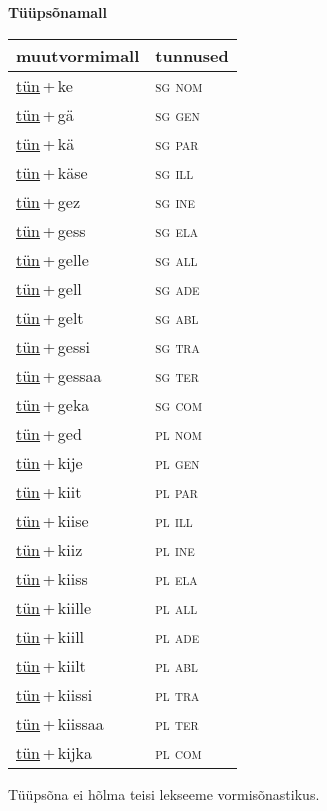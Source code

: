 
\vspace{1.8em}
\begin{minipage}{\textwidth}
\textbf{Tüüpsõnamall \,}\\

\begin{sideways}
\begin{tabular}{l l}
muutvormimall & tunnused \\
\hline
\underline{tün}\,+\,ke & \textsc{ sg nom } \\
\underline{tün}\,+\,gä & \textsc{ sg gen } \\
\underline{tün}\,+\,kä & \textsc{ sg par } \\
\underline{tün}\,+\,käse & \textsc{ sg ill } \\
\underline{tün}\,+\,gez & \textsc{ sg ine } \\
\underline{tün}\,+\,gess & \textsc{ sg ela } \\
\underline{tün}\,+\,gelle & \textsc{ sg all } \\
\underline{tün}\,+\,gell & \textsc{ sg ade } \\
\underline{tün}\,+\,gelt & \textsc{ sg abl } \\
\underline{tün}\,+\,gessi & \textsc{ sg tra } \\
\underline{tün}\,+\,gessaa & \textsc{ sg ter } \\
\underline{tün}\,+\,geka & \textsc{ sg com } \\
\underline{tün}\,+\,ged & \textsc{ pl nom } \\
\underline{tün}\,+\,kije & \textsc{ pl gen } \\
\underline{tün}\,+\,kiit & \textsc{ pl par } \\
\underline{tün}\,+\,kiise & \textsc{ pl ill } \\
\underline{tün}\,+\,kiiz & \textsc{ pl ine } \\
\underline{tün}\,+\,kiiss & \textsc{ pl ela } \\
\underline{tün}\,+\,kiille & \textsc{ pl all } \\
\underline{tün}\,+\,kiill & \textsc{ pl ade } \\
\underline{tün}\,+\,kiilt & \textsc{ pl abl } \\
\underline{tün}\,+\,kiissi & \textsc{ pl tra } \\
\underline{tün}\,+\,kiissaa & \textsc{ pl ter } \\
\underline{tün}\,+\,kijka & \textsc{ pl com } \\
\end{tabular}
\end{sideways}
\label{tab:tüüpsõnamall-tünke}

\end{minipage}

 
\vspace{1em}
\noindent Tüüpsõna ei hõlma teisi lekseeme vormi\-sõnastikus.
